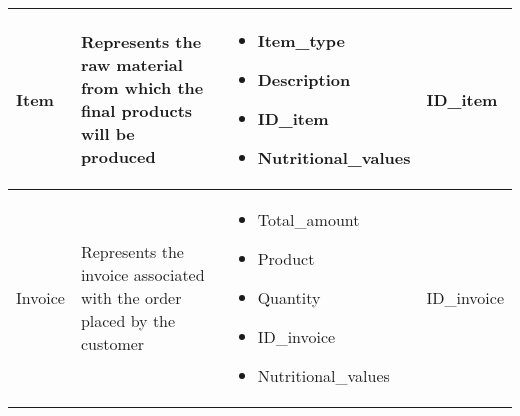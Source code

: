 \begin{longtable}{|p{}|p{} |p{}|p{} |}
    Item & Represents the raw material from which the final products will be produced &
    \begin{itemize}
        \vspace{-1em}
        \item Item\_type
        \item Description
        \item ID\_item
        \item Nutritional\_values
    \end{itemize}
    &  ID\_item \\\hline

    Invoice & Represents the invoice associated with the order placed by the customer &
        \begin{itemize}
            \vspace{-1em}
            \item Total\_amount
            \item Product
            \item Quantity
            \item ID\_invoice
            \item Nutritional\_values
        \end{itemize}
        &  ID\_invoice \\\hline
\end{longtable}